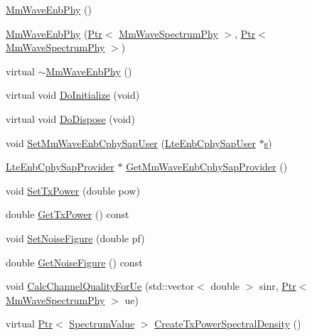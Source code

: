 \begin{DoxyCompactItemize}
\item 
\hyperlink{classns3_1_1MmWaveEnbPhy_ac81f0b473262b78aad27fc668e90eef2}{Mm\+Wave\+Enb\+Phy} ()
\item 
\hyperlink{classns3_1_1MmWaveEnbPhy_a1a187906c7eea07b987f27ab0fd95537}{Mm\+Wave\+Enb\+Phy} (\hyperlink{classns3_1_1Ptr}{Ptr}$<$ \hyperlink{classns3_1_1MmWaveSpectrumPhy}{Mm\+Wave\+Spectrum\+Phy} $>$, \hyperlink{classns3_1_1Ptr}{Ptr}$<$ \hyperlink{classns3_1_1MmWaveSpectrumPhy}{Mm\+Wave\+Spectrum\+Phy} $>$)
\item 
virtual \hyperlink{classns3_1_1MmWaveEnbPhy_a55e3eb920b1eeb9d4cec4e9db9cbddb6}{$\sim$\+Mm\+Wave\+Enb\+Phy} ()
\item 
virtual void \hyperlink{classns3_1_1MmWaveEnbPhy_ad591594eeb17ea029240b75c9f578578}{Do\+Initialize} (void)
\item 
virtual void \hyperlink{classns3_1_1MmWaveEnbPhy_a3d20f3cf3e894fadeb08b42cca8e9da4}{Do\+Dispose} (void)
\item 
void \hyperlink{classns3_1_1MmWaveEnbPhy_ae5494b931712a00d40c1c4b2e75c2d28}{Set\+Mm\+Wave\+Enb\+Cphy\+Sap\+User} (\hyperlink{classns3_1_1LteEnbCphySapUser}{Lte\+Enb\+Cphy\+Sap\+User} $\ast$\hyperlink{generate__test__data__lte__sinr_8m_ad83eeb3a142285d1243a08c6b7026df8}{s})
\item 
\hyperlink{classns3_1_1LteEnbCphySapProvider}{Lte\+Enb\+Cphy\+Sap\+Provider} $\ast$ \hyperlink{classns3_1_1MmWaveEnbPhy_ab42c72ea54e88d87815abd834f19d21e}{Get\+Mm\+Wave\+Enb\+Cphy\+Sap\+Provider} ()
\item 
void \hyperlink{classns3_1_1MmWaveEnbPhy_a6c1dbccbab28c6883bf5a716d6605138}{Set\+Tx\+Power} (double pow)
\item 
double \hyperlink{classns3_1_1MmWaveEnbPhy_a83906efb88780c06a13f2f095e25e6a8}{Get\+Tx\+Power} () const 
\item 
void \hyperlink{classns3_1_1MmWaveEnbPhy_a43b75a8b0a7dcba2ad88f8c6bb5692c2}{Set\+Noise\+Figure} (double pf)
\item 
double \hyperlink{classns3_1_1MmWaveEnbPhy_a3640fc17414c1e6b0edca0b043263cc8}{Get\+Noise\+Figure} () const 
\item 
void \hyperlink{classns3_1_1MmWaveEnbPhy_af8a1a892c01cd11c3de0909b2a37bf07}{Calc\+Channel\+Quality\+For\+Ue} (std\+::vector$<$ double $>$ sinr, \hyperlink{classns3_1_1Ptr}{Ptr}$<$ \hyperlink{classns3_1_1MmWaveSpectrumPhy}{Mm\+Wave\+Spectrum\+Phy} $>$ ue)
\item 
virtual \hyperlink{classns3_1_1Ptr}{Ptr}$<$ \hyperlink{classns3_1_1SpectrumValue}{Spectrum\+Value} $>$ \hyperlink{classns3_1_1MmWaveEnbPhy_a015a2751530829de95c6c92dfdd3a2ee}{Create\+Tx\+Power\+Spectral\+Density} ()

\end{DoxyCompactItemize}
